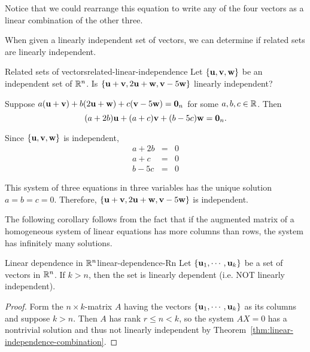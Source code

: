 \begin{solution}
Notice that we could rearrange this equation to write any of the four vectors as a linear combination of the other three. 
\end{solution}

When given a linearly independent set of vectors, we can determine if related sets are linearly independent. 

\begin{example}{Related sets of vectors}{related-linear-independence}
Let $\{\mbox{\bf u},\mbox{\bf v},\mbox{\bf w}\}$ be an independent set of $\mathbb{R}^n$.
Is $\{\mbox{\bf u}+\mbox{\bf v}, 2\mbox{\bf u}+\mbox{\bf w}, \mbox{\bf v}-5\mbox{\bf w}\}$ linearly
independent?
\end{example}

\begin{solution}
Suppose $a(\mbox{\bf u}+\mbox{\bf v}) + b(2\mbox{\bf u}+\mbox{\bf w}) + c(\mbox{\bf v}-5\mbox{\bf w})=\mbox{\bf 0}_n$
for some $a,b,c\in\mathbb{R}$.
Then 
\[ (a+2b)\mbox{\bf u} + (a+c)\mbox{\bf v} + (b-5c)\mbox{\bf w}=\mbox{\bf 0}_n.\]

Since $\{\mbox{\bf u},\mbox{\bf v},\mbox{\bf w}\}$ is independent, 
\begin{eqnarray*}
a + 2b & = & 0 \\
a + c & = & 0 \\
b - 5c & = & 0 
\end{eqnarray*}

This system of three equations in three variables has 
the unique solution $a=b=c=0$.
Therefore, $\{\mbox{\bf u}+\mbox{\bf v}, 2\mbox{\bf u}+\mbox{\bf w}, \mbox{\bf v}-5\mbox{\bf w}\}$ is independent.
\end{solution}

The following corollary follows from the fact that if the augmented matrix of a homogeneous
system of linear equations has more columns than rows, the system has infinitely many
solutions.

\begin{corollary}{Linear dependence in $\mathbb{R}^{n}$}{linear-dependence-Rn}
Let $\left\{\mbox{\bf u}_{1},\cdots ,\mbox{\bf u}_{k}\right\} $
be a set of vectors in $\mathbb{R}^{n}$. 
If $k>n$, then the set is linearly dependent (i.e. NOT linearly independent).
\end{corollary}

\begin{proof}
Form the $n \times k$-matrix $A$ having the vectors $\left\{
\mbox{\bf u}_{1},\cdots ,\mbox{\bf u}_{k}\right\} $ as its columns and suppose $k > n$. Then $A$ has rank $r \leq n <k$, so 
the system $AX=0$ has a nontrivial solution %
 and thus not linearly independent by Theorem~\ref{thm:linear-independence-combination}.
\end{proof}

